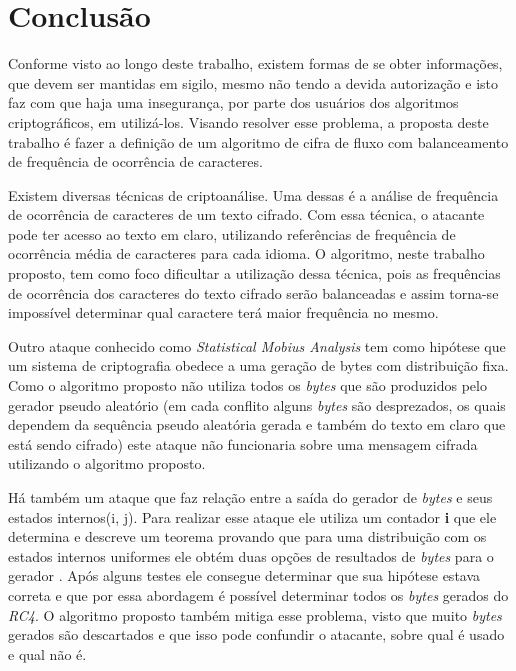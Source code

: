 \chapter{Conclusão}
\label{conclusion}


Conforme visto ao longo deste trabalho, existem formas de se obter informações, que devem ser mantidas em sigilo, mesmo não tendo a devida autorização e isto faz com que haja uma insegurança, por parte dos usuários dos algoritmos criptográficos, em utilizá-los. Visando resolver esse problema, a proposta deste trabalho é fazer a definição de um algoritmo de cifra de fluxo com balanceamento de frequência de ocorrência de caracteres.

Existem diversas técnicas de criptoanálise. Uma dessas é a análise de frequência de ocorrência de caracteres de um texto cifrado. Com essa técnica, o atacante pode ter acesso ao texto em claro, utilizando referências de frequência de ocorrência média de caracteres para cada idioma. O algoritmo, neste trabalho proposto, tem como foco dificultar a utilização dessa técnica, pois as frequências de ocorrência dos caracteres do texto cifrado serão balanceadas e assim torna-se impossível determinar qual caractere terá maior frequência no mesmo.

Outro ataque conhecido como \textit{Statistical Mobius Analysis} tem como hipótese que um sistema de criptografia obedece a uma geração de bytes com distribuição fixa\cite{eric-filiol}. Como o algoritmo proposto não utiliza todos os \textit{bytes} que são produzidos pelo gerador pseudo aleatório (em cada conflito alguns \textit{bytes} são desprezados, os quais dependem da sequência pseudo aleatória gerada e também do texto em claro que está sendo cifrado) este ataque não funcionaria sobre uma mensagem cifrada utilizando o algoritmo proposto.

Há também um ataque que faz relação entre a saída do gerador de \textit{bytes} e seus estados internos(i, j). Para realizar esse ataque ele utiliza um contador \textbf{i} que ele determina e descreve um teorema provando que para uma distribuição com os estados internos uniformes ele obtém duas opções de resultados de \textit{bytes} para o gerador \cite{andreas-klein}. Após alguns testes ele consegue determinar que sua hipótese estava correta e que por essa abordagem é possível determinar todos os \textit{bytes} gerados do \textit{RC4}. O algoritmo proposto também mitiga esse problema, visto que muito \textit{bytes} gerados são descartados e que isso pode confundir o atacante, sobre qual é usado e qual não é.


